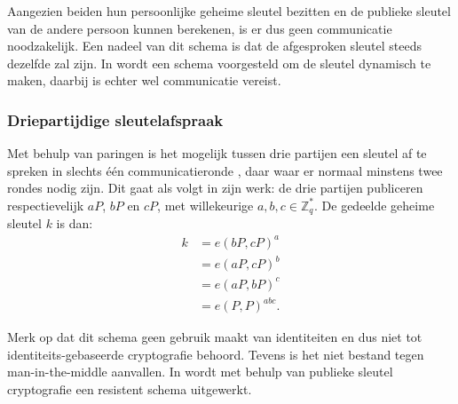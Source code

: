 Aangezien beiden hun persoonlijke geheime sleutel bezitten en de publieke sleutel van de andere persoon kunnen berekenen, is er dus geen communicatie noodzakelijk. Een nadeel van dit schema is dat de afgesproken sleutel steeds dezelfde zal zijn. In \cite{smart} wordt een schema voorgesteld om de sleutel dynamisch te maken, daarbij is echter wel communicatie vereist.

\subsubsection{Driepartijdige sleutelafspraak}

Met behulp van paringen is het mogelijk tussen drie partijen een sleutel af te spreken in slechts \'e\'en communicatieronde \cite{joux}, daar waar er normaal minstens twee rondes nodig zijn. Dit gaat als volgt in zijn werk: de drie partijen publiceren respectievelijk $aP$, $bP$ en $cP$, met willekeurige $a, b, c \in \mathbb{Z}_q^*$. De gedeelde geheime sleutel $k$ is dan:
\[\begin{aligned}
k	&= e(bP, cP)^a\\
	&= e(aP, cP)^b\\
	&= e(aP, bP)^c\\
	&= e(P, P)^{abc}.
\end{aligned}\]

Merk op dat dit schema geen gebruik maakt van identiteiten en dus niet tot identiteits-gebaseerde cryptografie behoord. Tevens is het niet bestand tegen man-in-the-middle aanvallen. In \cite{paterson} wordt met behulp van publieke sleutel cryptografie een resistent schema uitgewerkt.
